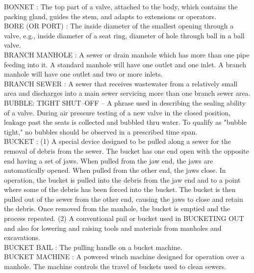 \vspace{0.15cm}
BONNET :   The top part of a valve, attached to the body, which contains the packing gland, guides the stem, and adapts to extensions or operators.\\
\vspace{0.15cm}
BORE (OR PORT) :   The inside diameter of the smallest opening through a valve, e.g., inside diameter of a seat ring, diameter of hole through ball in a ball valve.\\
\vspace{0.15cm}
BRANCH MANHOLE :  A sewer or drain manhole which has more than one pipe feeding into it. A standard manhole will have one outlet and one inlet. A branch manhole will have one outlet and two or more inlets. \\
\vspace{0.15cm}
BRANCH SEWER :  A sewer that receives wastewater from a relatively small area and discharges into a main sewer servicing more than one branch sewer area. \\
\vspace{0.15cm}
BUBBLE: TIGHT SHUT–OFF –  A phrase used in describing the sealing ability of a valve. During air pressure testing of a new valve in the closed position, leakage past the seats is collected and bubbled thru water. To qualify as "bubble tight," no bubbles should be observed in a prescribed time span.\\
\vspace{0.15cm}
BUCKET :  (1) A special device designed to be pulled along a sewer for the removal of debris from the sewer. The bucket has one end open with the opposite end having a set of jaws. When pulled from the jaw end, the jaws are automatically opened. When pulled from the other end, the jaws close. In operation, the bucket is pulled into the debris from the jaw end and to a point where some of the debris has been forced into the bucket. The bucket is then pulled out of the sewer from the other end, causing the jaws to close and retain the debris. Once removed from the manhole, the bucket is emptied and the process repeated. (2) A conventional pail or bucket used in BUCKETING OUT and also for lowering and raising tools and materials from manholes and excavations. \\
\vspace{0.15cm}
BUCKET BAIL :  The pulling handle on a bucket machine. \\
\vspace{0.15cm}
BUCKET MACHINE : A powered winch machine designed for operation over a manhole. The machine controls the travel of buckets used to clean sewers. \\
